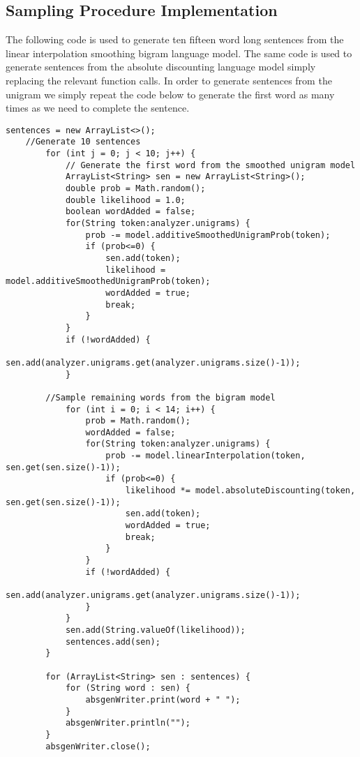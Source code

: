 \documentclass[paper=a4, fontsize=11pt]{jhwhw} %
\begin{document}
\subsection{Sampling Procedure Implementation}
The following code is used to generate ten fifteen word long sentences from the linear interpolation
smoothing bigram language model. The same code is used to generate sentences from
the absolute discounting language model simply replacing the relevant function calls.
In order to generate sentences from the unigram we simply repeat the code below to generate the first word
as many times as we need to complete the sentence.
\begin{lstlisting}
sentences = new ArrayList<>();
	//Generate 10 sentences
        for (int j = 0; j < 10; j++) {
            // Generate the first word from the smoothed unigram model
            ArrayList<String> sen = new ArrayList<String>();
            double prob = Math.random();
            double likelihood = 1.0;
            boolean wordAdded = false;
            for(String token:analyzer.unigrams) {
                prob -= model.additiveSmoothedUnigramProb(token);
                if (prob<=0) {
                    sen.add(token);
                    likelihood = model.additiveSmoothedUnigramProb(token);
                    wordAdded = true;
                    break;
                }
            }
            if (!wordAdded) {
                sen.add(analyzer.unigrams.get(analyzer.unigrams.size()-1));
            }
	    
	    //Sample remaining words from the bigram model
            for (int i = 0; i < 14; i++) {
                prob = Math.random(); 
                wordAdded = false;
                for(String token:analyzer.unigrams) {
                    prob -= model.linearInterpolation(token, sen.get(sen.size()-1));
                    if (prob<=0) {
                        likelihood *= model.absoluteDiscounting(token, sen.get(sen.size()-1));
                        sen.add(token);
                        wordAdded = true;
                        break;
                    }
                }
                if (!wordAdded) {
                    sen.add(analyzer.unigrams.get(analyzer.unigrams.size()-1));
                }
            }
            sen.add(String.valueOf(likelihood));
            sentences.add(sen);
        }

        for (ArrayList<String> sen : sentences) {
            for (String word : sen) {
                absgenWriter.print(word + " ");
            }
            absgenWriter.println("");
        }
        absgenWriter.close();
\end{lstlisting}
\end{document}
